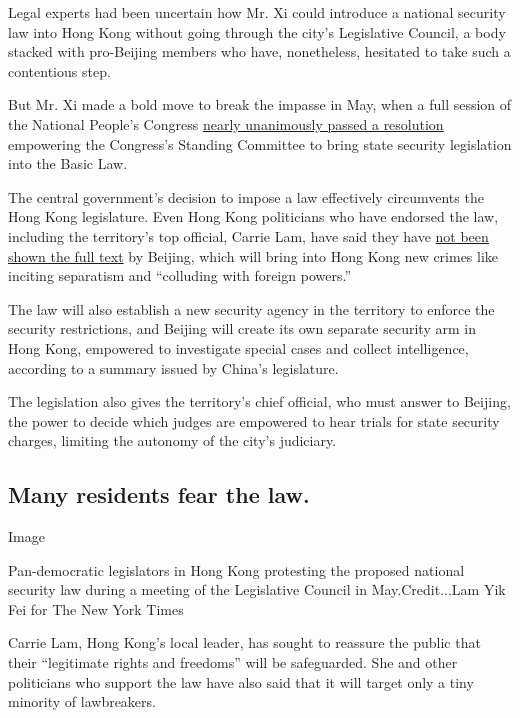Legal experts had been uncertain how Mr. Xi could introduce a national
security law into Hong Kong without going through the city's Legislative
Council, a body stacked with pro-Beijing members who have, nonetheless,
hesitated to take such a contentious step.

But Mr. Xi made a bold move to break the impasse in May, when a full
session of the National People's Congress
\href{https://www.nytimes3xbfgragh.onion/2020/05/28/world/asia/china-hong-kong-crackdown.html}{nearly
unanimously passed a resolution} empowering the Congress's Standing
Committee to bring state security legislation into the Basic Law.

The central government's decision to impose a law effectively
circumvents the Hong Kong legislature. Even Hong Kong politicians who
have endorsed the law, including the territory's top official, Carrie
Lam, have said they have
\href{https://sc.isd.gov.hk/TuniS/www.info.gov.hk/gia/general/202006/23/P2020062300464.htm}{not
been shown the full text} by Beijing, which will bring into Hong Kong
new crimes like inciting separatism and ``colluding with foreign
powers.''

The law will also establish a new security agency in the territory to
enforce the security restrictions, and Beijing will create its own
separate security arm in Hong Kong, empowered to investigate special
cases and collect intelligence, according to a summary issued by China's
legislature.

The legislation also gives the territory's chief official, who must
answer to Beijing, the power to decide which judges are empowered to
hear trials for state security charges, limiting the autonomy of the
city's judiciary.

\hypertarget{many-residents-fear-the-law}{%
\subsection{Many residents fear the
law.}\label{many-residents-fear-the-law}}

Image

Pan-democratic legislators in Hong Kong protesting the proposed national
security law during a meeting of the Legislative Council in
May.Credit...Lam Yik Fei for The New York Times

Carrie Lam, Hong Kong's local leader, has sought to reassure the public
that their ``legitimate rights and freedoms'' will be safeguarded. She
and other politicians who support the law have also said that it will
target only a tiny minority of lawbreakers.

